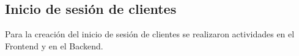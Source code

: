 \subsection{Inicio de sesión de clientes}
Para la creación del inicio de sesión de clientes se realizaron actividades en el Frontend y en el Backend.
    
    